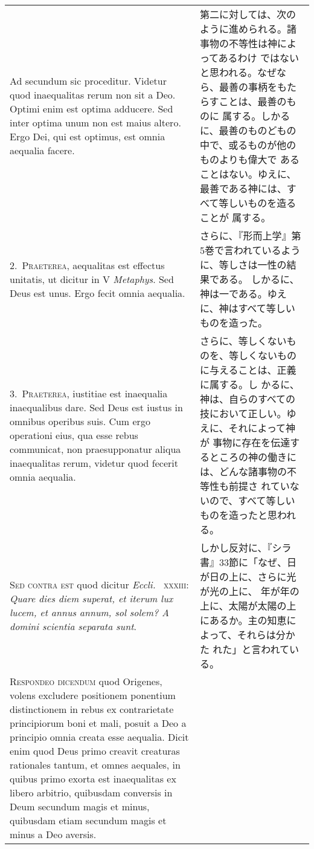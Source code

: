 \documentclass[10pt]{jsarticle} %
\begin{document}
\begin{longtable}{p{21em}p{21em}}

{\huge A}{\sc d secundum} sic proceditur. Videtur quod inaequalitas
rerum non sit a Deo. Optimi enim est optima adducere. Sed inter optima
unum non est maius altero. Ergo Dei, qui est optimus, est omnia aequalia
facere.

&

第二に対しては、次のように進められる。諸事物の不等性は神によってあるわけ
 ではないと思われる。なぜなら、最善の事柄をもたらすことは、最善のものに
 属する。しかるに、最善のものどもの中で、或るものが他のものよりも偉大で
 あることはない。ゆえに、最善である神には、すべて等しいものを造ることが
 属する。

\\

2.~{\scshape Praeterea}, aequalitas est effectus unitatis, ut dicitur in
V {\itshape Metaphys}. Sed Deus est unus. Ergo fecit omnia aequalia.

&
さらに、『形而上学』第5巻で言われているように、等しさは一性の結果である。
しかるに、神は一である。ゆえに、神はすべて等しいものを造った。


\\


3.~{\scshape Praeterea}, iustitiae est inaequalia
inaequalibus dare. Sed Deus est iustus in omnibus operibus suis. Cum
ergo operationi eius, qua esse rebus communicat, non praesupponatur
aliqua inaequalitas rerum, videtur quod fecerit omnia aequalia.

&
さらに、等しくないものを、等しくないものに与えることは、正義に属する。し
 かるに、神は、自らのすべての技において正しい。ゆえに、それによって神が
 事物に存在を伝達するところの神の働きには、どんな諸事物の不等性も前提さ
 れていないので、すべて等しいものを造ったと思われる。


\\

{\scshape Sed contra est} quod dicitur {\itshape Eccli.}~{\scshape
xxxiii}: {\itshape Quare dies diem superat, et iterum lux lucem, et
annus annum, sol solem?  A domini scientia separata sunt}.


&
しかし反対に、『シラ書』33節に「なぜ、日が日の上に、さらに光が光の上に、
 年が年の上に、太陽が太陽の上にあるか。主の知恵によって、それらは分かた
 れた」と言われている。


\\

{\scshape Respondeo dicendum} quod Origenes, volens
excludere positionem ponentium distinctionem in rebus ex contrarietate
principiorum boni et mali, posuit a Deo a principio omnia creata esse
aequalia. Dicit enim quod Deus primo creavit creaturas rationales
tantum, et omnes aequales, in quibus primo exorta est inaequalitas ex
libero arbitrio, quibusdam conversis in Deum secundum magis et minus,
quibusdam etiam secundum magis et minus a Deo aversis. 


\end{longtable}
\end{document}
